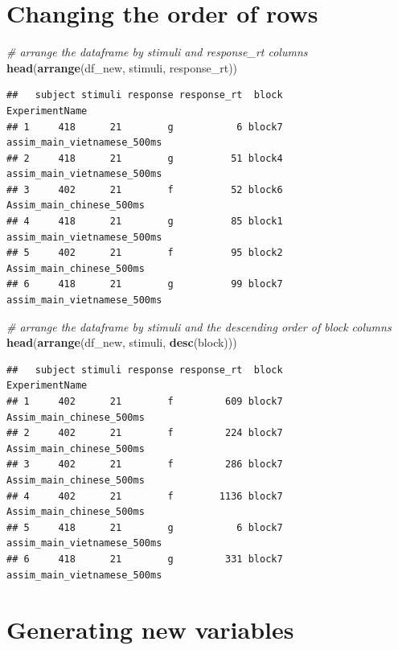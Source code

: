 \documentclass[]{book}
\newenvironment{Shaded}{\begin{snugshade}}{\end{snugshade}}
\newcommand{\KeywordTok}[1]{\textcolor[rgb]{0.13,0.29,0.53}{\textbf{#1}}}
\newcommand{\CommentTok}[1]{\textcolor[rgb]{0.56,0.35,0.01}{\textit{#1}}}
\newcommand{\NormalTok}[1]{#1}
\begin{document}
\section{Changing the order of rows}\label{changing-the-order-of-rows}

\begin{Shaded}
\begin{Highlighting}[]
\CommentTok{# arrange the dataframe by stimuli and response_rt columns}
\KeywordTok{head}\NormalTok{(}\KeywordTok{arrange}\NormalTok{(df_new, stimuli, response_rt))}
\end{Highlighting}
\end{Shaded}

\begin{verbatim}
##   subject stimuli response response_rt  block              ExperimentName
## 1     418      21        g           6 block7 assim_main_vietnamese_500ms
## 2     418      21        g          51 block4 assim_main_vietnamese_500ms
## 3     402      21        f          52 block6    Assim_main_chinese_500ms
## 4     418      21        g          85 block1 assim_main_vietnamese_500ms
## 5     402      21        f          95 block2    Assim_main_chinese_500ms
## 6     418      21        g          99 block7 assim_main_vietnamese_500ms
\end{verbatim}

\begin{Shaded}
\begin{Highlighting}[]
\CommentTok{# arrange the dataframe by stimuli and the descending order of block columns}
\KeywordTok{head}\NormalTok{(}\KeywordTok{arrange}\NormalTok{(df_new, stimuli, }\KeywordTok{desc}\NormalTok{(block)))}
\end{Highlighting}
\end{Shaded}

\begin{verbatim}
##   subject stimuli response response_rt  block              ExperimentName
## 1     402      21        f         609 block7    Assim_main_chinese_500ms
## 2     402      21        f         224 block7    Assim_main_chinese_500ms
## 3     402      21        f         286 block7    Assim_main_chinese_500ms
## 4     402      21        f        1136 block7    Assim_main_chinese_500ms
## 5     418      21        g           6 block7 assim_main_vietnamese_500ms
## 6     418      21        g         331 block7 assim_main_vietnamese_500ms
\end{verbatim}

\section{Generating new variables}\label{generating-new-variables}
\end{document}
